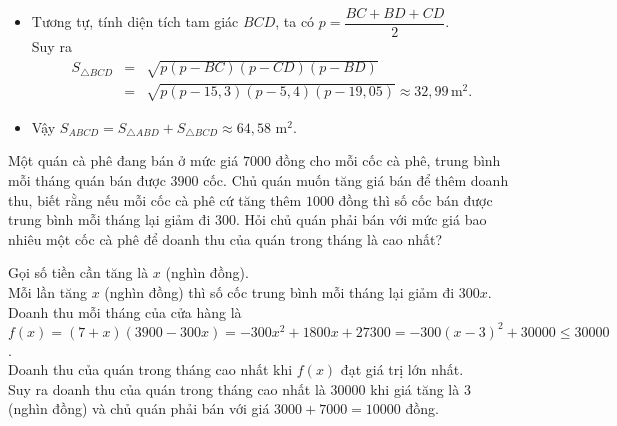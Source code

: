 \begin{bt}
{\begin{itemize}
			\item Tương tự, tính diện tích tam giác $BCD$, ta có
			$p=\dfrac{BC+BD+CD}{2}$.\\
			Suy ra 
			\begin{eqnarray*}
				S_{\triangle BCD}&=&\sqrt{p(p-BC)(p-CD)(p-BD)}\\
				&=&\sqrt{p(p-15{,}3)(p-5{,}4)(p-19{,}05)}\approx 32{,}99\, \text{m}^2.
			\end{eqnarray*}
			
			\item Vậy $S_{ABCD}=S_{\triangle ABD}+S_{\triangle BCD}\approx 64{,}58$ m$^2$.
		\end{itemize}
	}
\end{bt}
\begin{bt}%
	Một quán cà phê đang bán ở mức giá $7000$ đồng cho mỗi cốc cà phê, trung bình mỗi tháng quán bán được $3900$ cốc. Chủ quán muốn tăng giá bán để thêm doanh thu, biết rằng nếu mỗi cốc cà phê cứ tăng thêm $1000$ đồng thì số cốc bán được trung bình mỗi tháng lại giảm đi $300$. Hỏi chủ quán phải bán với mức giá bao nhiêu một cốc cà phê để doanh thu của quán trong tháng là cao nhất?
	\loigiai
	{
		Gọi số tiền cần tăng là $x$ (nghìn đồng).\\
		Mỗi lần tăng $x$ (nghìn đồng) thì số cốc trung bình mỗi tháng lại giảm đi $300x$.\\
		Doanh thu mỗi tháng của cửa hàng là\\
		 $f(x)=(7+x)(3900-300x)=-300x^2+1800x+27300=-300(x-3)^2+30000 \le 30000$.\\
		Doanh thu của quán trong tháng cao nhất khi $f(x)$ đạt giá trị lớn nhất.\\
		Suy ra doanh thu của quán trong tháng cao nhất là $30000$ khi giá tăng là $3$ (nghìn đồng) và chủ quán phải bán với giá $3000 + 7000 = 10000$ đồng.
		
}
\end{bt}




